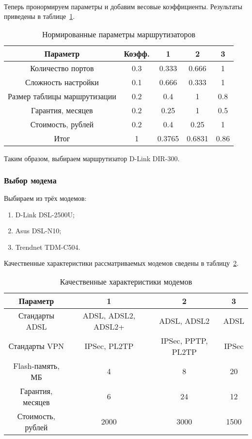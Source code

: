 Теперь пронормируем параметры и добавим весовые коэффициенты. Результаты приведены в таблице~\ref{table:router_compare}.

\begin{table}[h]
\caption{Нормированные параметры маршрутизаторов}
\label{table:router_compare}
\centering
  \begin{tabular}{|c|c|c|c|c|}
  \hline Параметр & Коэфф. & 1 & 2 & 3 \\
  \hline Количество портов & 0.3 & 0.333 & 0.666 & 1 \\
  \hline Сложность настройки & 0.1 & 0.666 & 0.333 & 1 \\
  \hline Размер таблицы маршрутизации & 0.2 & 0.4 & 1 & 0.8 \\
  \hline Гарантия, месяцев & 0.2 & 0.25 & 1 & 0.5 \\
  \hline Стоимость, рублей & 0.2 & 0.4 & 0.25 & 1 \\
  \hline Итог & 1 & 0.3765 & 0.6831 & 0.86 \\
  \hline
  \end{tabular}
\end{table}

Таким образом, выбираем маршрутизатор D-Link DIR-300.

\subsubsection{Выбор модема}

Выбираем из трёх модемов:
\begin{enumerate}
\item D-Link DSL-2500U;
\item Asus DSL-N10;
\item Trendnet TDM-C504.
\end{enumerate}

Качественные характеристики рассматриваемых модемов сведены в таблицу~\ref{table:modem_compare_qual}.

\begin{table}[h]
\caption{Качественные характеристики модемов}
\label{table:modem_compare_qual}
\centering
  \begin{tabular}{|c|c|c|c|}
  \hline Параметр & 1 & 2 & 3 \\
  \hline Стандарты ADSL & ADSL, ADSL2, ADSL2+ & ADSL, ADSL2 & ADSL \\
  \hline Стандарты VPN & IPSec, PL2TP & IPSec, PPTP, PL2TP & IPSec \\
  \hline Flash-память, МБ & 4 & 8 & 20 \\
  \hline Гарантия, месяцев & 6 & 24 & 12 \\
  \hline Стоимость, рублей & 2000 & 3000 & 1500 \\
  \hline
  \end{tabular}
\end{table}

